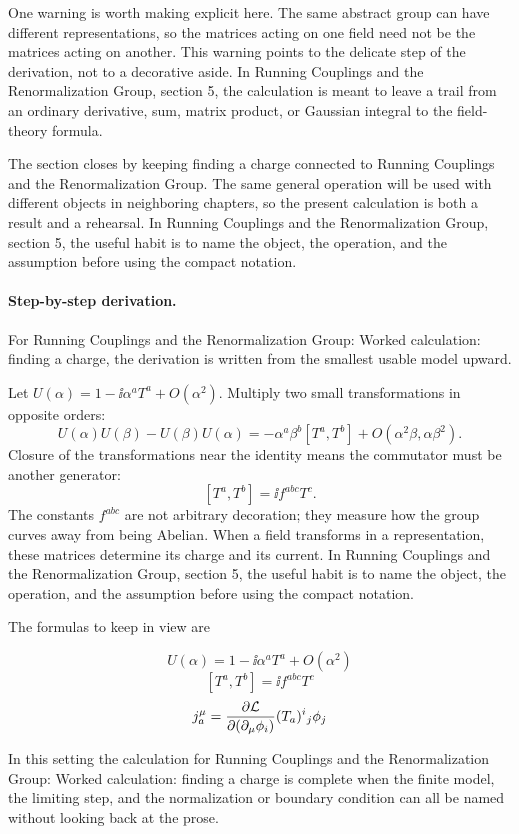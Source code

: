 One warning is worth making explicit here.  The same abstract group can have different representations, so the matrices acting on one field need not be the matrices acting on another.  This warning points to the delicate step of the derivation, not to a decorative aside.  In Running Couplings and the Renormalization Group, section 5, the calculation is meant to leave a trail from an ordinary derivative, sum, matrix product, or Gaussian integral to the field-theory formula.

The section closes by keeping finding a charge connected to Running Couplings and the Renormalization Group.  The same general operation will be used with different objects in neighboring chapters, so the present calculation is both a result and a rehearsal.  In Running Couplings and the Renormalization Group, section 5, the useful habit is to name the object, the operation, and the assumption before using the compact notation.



\paragraph{Step-by-step derivation.}

For Running Couplings and the Renormalization Group: Worked calculation: finding a charge, the derivation is written from the smallest usable model upward.

Let \(U(\alpha)=1-\ii\alpha^aT^a+O(\alpha^2)\).  Multiply two small transformations in opposite orders:
\[
  U(\alpha)U(\beta)-U(\beta)U(\alpha)
  =
  -\alpha^a\beta^b[T^a,T^b]+O(\alpha^2\beta,\alpha\beta^2).
\]
Closure of the transformations near the identity means the commutator must be another generator:
\[
  [T^a,T^b]=\ii f^{abc}T^c.
\]
The constants \(f^{abc}\) are not arbitrary decoration; they measure how the group curves away from being Abelian.  When a field transforms in a representation, these matrices determine its charge and its current.  In Running Couplings and the Renormalization Group, section 5, the useful habit is to name the object, the operation, and the assumption before using the compact notation.

The formulas to keep in view are

\[
  U(\alpha)=1-\ii\alpha^aT^a+O(\alpha^2)
\]
\[
  [T^a,T^b]=\ii f^{abc}T^c
\]
\[
  j^\mu_a=\frac{\partial\mathcal L}{\partial(\partial_\mu\phi_i)}(T_a)^i{}_j\phi_j
\]

In this setting the calculation for Running Couplings and the Renormalization Group: Worked calculation: finding a charge is complete when the finite model, the limiting step, and the normalization or boundary condition can all be named without looking back at the prose.





